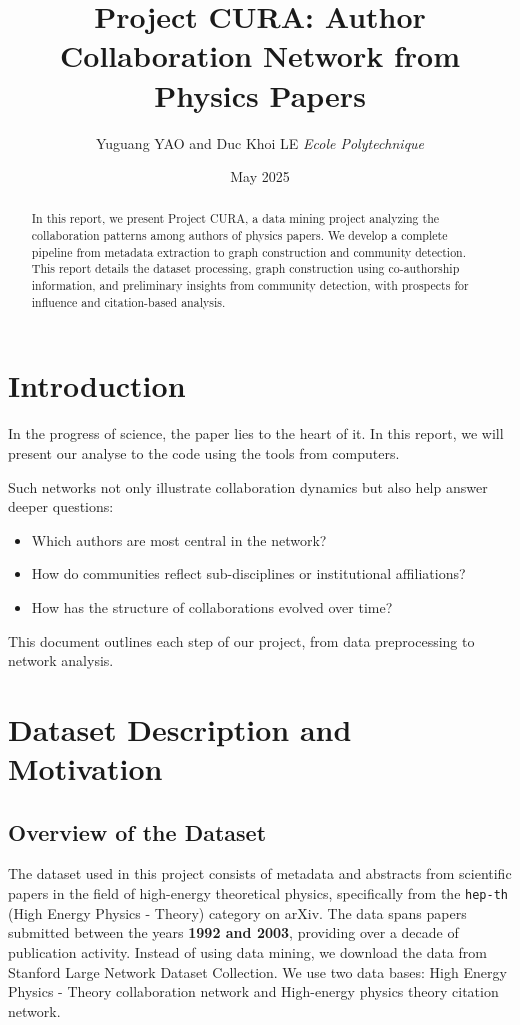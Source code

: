 \documentclass[12pt]{article}
\title{Project CURA: Author Collaboration Network from Physics Papers}
\author{Yuguang YAO and Duc Khoi LE  \textit{\small Ecole Polytechnique}}
\date{May 2025}
\begin{document}
\maketitle

\begin{abstract}
In this report, we present Project CURA, a data mining project analyzing the collaboration patterns among authors of physics papers. We develop a complete pipeline from metadata extraction to graph construction and community detection. This report details the dataset processing, graph construction using co-authorship information, and preliminary insights from community detection, with prospects for influence and citation-based analysis.
\end{abstract}

\tableofcontents

\newpage

\section{Introduction}
In the progress of science, the paper lies to the heart of it. In this report, we will present our analyse to the code using the tools from computers. 

Such networks not only illustrate collaboration dynamics but also help answer deeper questions:
\begin{itemize}
\item Which authors are most central in the network?
\item How do communities reflect sub-disciplines or institutional affiliations?
\item How has the structure of collaborations evolved over time?
\end{itemize}

This document outlines each step of our project, from data preprocessing to network analysis.

\section{Dataset Description and Motivation}

\subsection{Overview of the Dataset}

The dataset used in this project consists of metadata and abstracts from scientific papers in the field of high-energy theoretical physics, specifically from the \texttt{hep-th} (High Energy Physics - Theory) category on arXiv. The data spans papers submitted between the years \textbf{1992 and 2003}, providing over a decade of publication activity. Instead of using data mining, we download the data from Stanford Large Network Dataset Collection. We use two data bases: High Energy Physics - Theory collaboration network and High-energy physics theory citation network.
\end{document}
